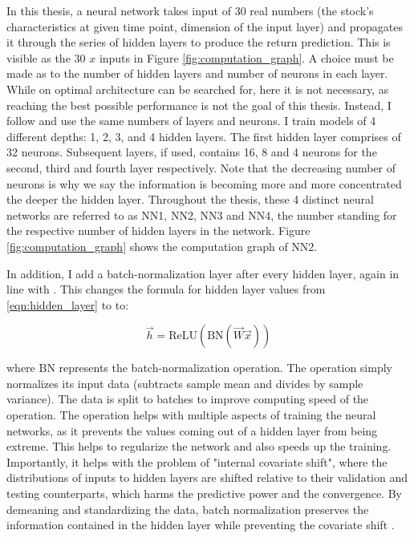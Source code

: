		In this thesis, a neural network takes input of 30 real numbers (the stock's characteristics at given time point, dimension of the input layer) and propagates it through the series of hidden layers to produce the return prediction. This is visible as the 30 $x$ inputs in Figure \ref{fig:computation_graph}. A choice must be made as to the number of hidden layers and number of neurons in each layer. While on optimal architecture can be searched for, here it is not necessary, as reaching the best possible performance is not the goal of this thesis. Instead, I follow \cite{gu2020empirical} and use the same numbers of layers and neurons. I train models of 4 different depths: 1, 2, 3, and 4 hidden layers. The first hidden layer comprises of 32 neurons. Subsequent layers, if used, contains 16, 8 and 4 neurons for the second, third and fourth layer respectively. Note that the decreasing number of neurons is why we say the information is becoming more and more concentrated the deeper the hidden layer. Throughout the thesis, these 4 distinct neural networks are referred to as NN1, NN2, NN3 and NN4, the number standing for the respective number of hidden layers in the network.  Figure \ref{fig:computation_graph} shows the computation graph of NN2.
		
		In addition, I add a batch-normalization layer \citep{ioffe2015batch} after every hidden layer, again in line with  \cite{gu2020empirical}. This changes the formula for hidden layer values from \ref{eqn:hidden_layer} to to: 
		
		\begin{equation}
			\vec{h} = \text{ReLU}(\text{BN}(\vec{W}\vec{x}))
		\end{equation}
		
		where $\text{BN}$ represents the batch-normalization operation. The operation simply normalizes its input data (subtracts sample mean and divides by sample variance). The data is split to batches to improve computing speed of the operation. The operation helps with multiple aspects of training the neural networks, as it prevents the values coming out of a hidden layer from being extreme. This helps to regularize the network and also speeds up the training. Importantly, it helps with the problem of "internal covariate shift", where the distributions of inputs to hidden layers are shifted relative to their validation and testing counterparts, which harms the predictive power and the convergence. By demeaning and standardizing the data, batch normalization preserves the information contained in the hidden layer while preventing the covariate shift \citep{ioffe2015batch}. 
		
